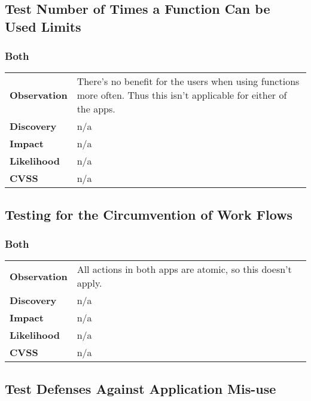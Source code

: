 \clearpage


\subsection{Test Number of Times a Function Can be Used Limits}
\subsubsection*{Both}
\begin{tabular}{l|p{10cm}}

\textbf{Observation} & There's no benefit for the users when using functions more often. Thus this isn't applicable for either of the apps. \\
\textbf{Discovery} & n/a \\
\textbf{Impact} & n/a \\
\textbf{Likelihood} & n/a \\
\textbf{CVSS} & n/a \\
\end{tabular}

\clearpage


\subsection{Testing for the Circumvention of Work Flows}
\subsubsection*{Both}
\begin{tabular}{l|p{10cm}}

\textbf{Observation} & All actions in both apps are atomic, so this doesn't apply. \\
\textbf{Discovery} & n/a \\
\textbf{Impact} & n/a \\
\textbf{Likelihood} & n/a \\
\textbf{CVSS} & n/a \\
\end{tabular}

\clearpage


\subsection{Test Defenses Against Application Mis-use}
